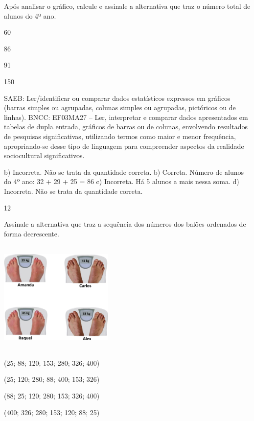\begin{escolha}
{\begin{escolha}
{Após analisar o gráfico, calcule e assinale a alternativa que traz o número total de alunos do 4º ano.

\begin{escolha}
\item
  60
\item
  86
\item
  91
\item
  150
\end{escolha}

SAEB: Ler/identificar ou comparar dados estatísticos
expressos em gráficos (barras simples ou agrupadas, colunas simples ou
agrupadas, pictóricos ou de linhas).
BNCC: EF03MA27 -- Ler, interpretar e comparar dados apresentados em tabelas de dupla entrada,
gráficos de barras ou de colunas, envolvendo resultados de pesquisas significativas, utilizando
termos como maior e menor frequência, apropriando-se desse tipo de linguagem para
compreender aspectos da realidade sociocultural significativos.

b) Incorreta. Não se trata da quantidade correta.
b) Correta. Número de alunos do 4º ano: 32 + 29 + 25 = 86 
c) Incorreta. Há 5 alunos a mais nessa soma.
d) Incorreta. Não se trata da quantidade correta.

\num{12}

Assinale a alternativa que traz a sequência dos números dos balões ordenados de forma decrescente.


\includegraphics[width=2.21686in,height=2.20852in]{media/image113.png}

\begin{escolha}
\item
  (25; 88; 120; 153; 280; 326; 400)
\item
  (25; 120; 280; 88; 400; 153; 326)
\item
  (88; 25; 120; 280; 153; 326; 400)
\item
  (400; 326; 280; 153; 120; 88; 25)
\end{escolha}

}
\end{escolha}}
\end{escolha}
